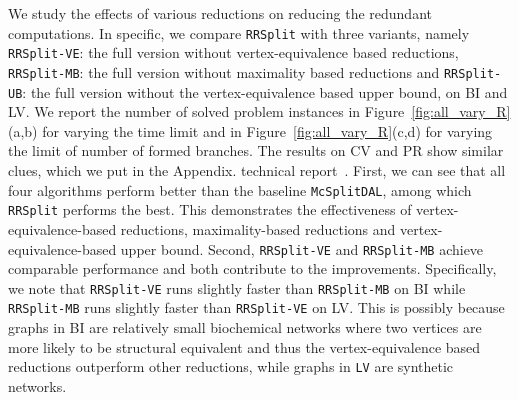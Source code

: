 We study the effects of various reductions on reducing the redundant computations. In specific, we compare \texttt{RRSplit} with three variants, namely \texttt{RRSplit-VE}: the full version without vertex-equivalence based reductions, \texttt{RRSplit-MB}: the full version without maximality based reductions and \texttt{RRSplit-UB}: the full version without the vertex-equivalence based upper bound, on \textsf{BI} and \textsf{LV}. We report the number of solved problem instances in Figure~\ref{fig:all_vary_R}(a,b) for varying the time limit and in Figure~\ref{fig:all_vary_R}(c,d) for varying the limit of number of formed branches. {\Yui The results on \textsf{CV} and \textsf{PR} show similar clues, which we put in the 
\ifx \CR\undefined
Appendix. 
\else
technical report~\cite{TR}. 
\fi
First, we can see that all four algorithms perform better than the baseline \texttt{McSplitDAL}, among which \texttt{RRSplit} performs the best. This demonstrates the effectiveness of vertex-equivalence-based reductions, maximality-based reductions and vertex-equivalence-based upper bound. Second, \texttt{RRSplit-VE} and \texttt{RRSplit-MB} {\chengB achieve} comparable performance and {\chengB both} contribute to the improvements. Specifically, we note that \texttt{RRSplit-VE} runs slightly faster than \texttt{RRSplit-MB} on \textsf{BI} while \texttt{RRSplit-MB} runs slightly faster than \texttt{RRSplit-VE} on \textsf{LV}. }  {\revision This is possibly because graphs in \textsf{BI} are relatively small biochemical networks where two vertices are more likely to be structural equivalent and thus the vertex-equivalence based reductions outperform other reductions, while graphs in \texttt{LV} are synthetic networks. }